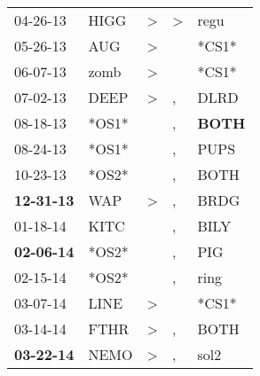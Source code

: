 \begin{supertabular}{p{0.07\textwidth}p{0.06\textwidth}p{0.02\textwidth}p{0.02\textwidth}p{0.06\textwidth}}
          04-26-13\textsuperscript{} &           HIGG\textsuperscript{} &     \textgreater &     \textgreater &           regu\textsuperscript{} \\
          05-26-13\textsuperscript{} &            AUG\textsuperscript{} &     \textgreater &                  &                            *CS1* \\
          06-07-13\textsuperscript{} &           zomb\textsuperscript{} &     \textgreater &                  &                            *CS1* \\
          07-02-13\textsuperscript{} &           DEEP\textsuperscript{} &     \textgreater &                , &           DLRD\textsuperscript{} \\
          08-18-13\textsuperscript{} &                            *OS1* &                  &                , &  \textbf{BOTH\textsuperscript{}} \\
          08-24-13\textsuperscript{} &                            *OS1* &                  &                , &           PUPS\textsuperscript{} \\
          10-23-13\textsuperscript{} &                            *OS2* &                  &                , &           BOTH\textsuperscript{} \\
 \textbf{12-31-13\textsuperscript{}} &            WAP\textsuperscript{} &     \textgreater &                , &           BRDG\textsuperscript{} \\
          01-18-14\textsuperscript{} &           KITC\textsuperscript{} &                  &                , &           BILY\textsuperscript{} \\
 \textbf{02-06-14\textsuperscript{}} &                            *OS2* &                  &                , &            PIG\textsuperscript{} \\
          02-15-14\textsuperscript{} &                            *OS2* &                  &                , &           ring\textsuperscript{} \\
          03-07-14\textsuperscript{} &           LINE\textsuperscript{} &     \textgreater &                  &                            *CS1* \\
          03-14-14\textsuperscript{} &           FTHR\textsuperscript{} &     \textgreater &                , &           BOTH\textsuperscript{} \\
 \textbf{03-22-14\textsuperscript{}} &           NEMO\textsuperscript{} &     \textgreater &                , &           sol2\textsuperscript{} \\

\end{supertabular}
